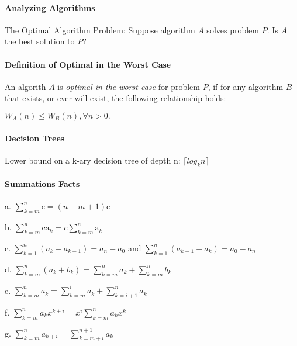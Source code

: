 \documentclass[10pt,twocolumn]{article}
\newenvironment{packed_list}{
\begin{itemize}
  \setlength{\itemsep}{1pt}
  \setlength{\parskip}{0pt}
  \setlength{\parsep}{0pt}
}{\end{itemize}}
\begin{document}
	\paragraph*{Analyzing Algorithms}
	The Optimal Algorithm Problem: Suppose algorithm $A$ solves
        problem $P$. Is $A$ the best solution to $P$?
	
	\paragraph*{Definition of Optimal in the Worst Case} An algorith
        $A$ is \emph{optimal in the worst case} for problem $P$, if
        for any algorithm $B$ that exists, or ever will exist, the
        following relationship holds:
	\begin{center}$W_A(n)\leq W_B(n),\forall n>0.$\end{center}
	
	\paragraph*{Decision Trees}
	Lower bound on a k-ary decision tree of depth n: $\lceil log_k n\rceil$
	
	\paragraph*{Summations Facts}
        \begin{packed_list}
	\item[a.] $ \displaystyle\sum_{k=m}^n \mathrm{c} = (n - m + 1)\mathrm{c}$ 
	\item[b.] $ \displaystyle\sum_{k=m}^n \mathrm{c a_\mathit{k}} = c
	\sum_{k=m}^n \mathrm{a_\mathit{k}}$
	\item[c.] $ \displaystyle\sum_{k=1}^n (a_\mathit{k} - a_\mathit{k - 1}) =
	a_\mathit{n} - a_\mathit{0}$ 
		and $ \displaystyle\sum_{k=1}^n
	(a_\mathit{k - 1} - a_\mathit{k}) = a_\mathit{0} - a_\mathit{n}$
	\item[d.] $\displaystyle\sum_{k=m}^n (a_\mathit{k} + b_\mathit{k}) =
	\sum_{k=m}^n a_\mathit{k} + \sum_{k=m}^n
	b_\mathit{k}$
	\item[e.] $\displaystyle\sum_{k=m}^n a_\mathit{k} = \sum_{k=m}^i
	a_\mathit{k} +  \sum_{k=i+1}^n a_\mathit{k}$
      \item[f.] $\displaystyle\sum_{k=m}^n a_\mathit{k}x^\mathit{k+i} = 
	x^\mathit{i} \sum_{k=m}^n a_\mathit{k}x^\mathit{k}$
	\item[g.] $\displaystyle\sum_{k=m}^n a_\mathit{k+i} = \sum_{k=m+i}^{n+1}
	a_\mathit{k}$
        \end{packed_list}
\end{document}
